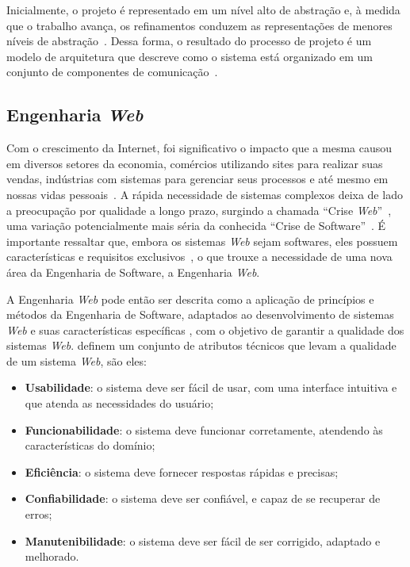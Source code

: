 Inicialmente, o projeto é representado em um nível alto de abstração e, à medida que o trabalho avança,
os refinamentos conduzem as representações de menores níveis de abstração~\cite{falbo:2014}.
Dessa forma, o resultado do processo de projeto é um modelo de arquitetura que descreve como o sistema
está organizado em um conjunto de componentes de comunicação~\cite{sommerville:2011}.


\subsection{Engenharia \textit{Web}}
\label{subsec-fundteo-engsoft-engweb}

Com o crescimento da Internet, foi significativo o impacto que a mesma causou em diversos
setores da economia, comércios utilizando sites para realizar suas vendas, indústrias com
sistemas para gerenciar seus processos e até mesmo em nossas vidas pessoais~\cite{murugesan:2001}.
A rápida necessidade de sistemas complexos deixa de lado a preocupação por qualidade a longo prazo,
surgindo a chamada ``Crise \textit{Web}''~\cite{murugesan:2001}, uma variação potencialmente mais séria da 
conhecida ``Crise de Software''~\cite{gibbs:1994}. É importante ressaltar que, embora os sistemas \textit{Web}
sejam softwares, eles possuem características e requisitos exclusivos~\cite{pressman:2011},
o que trouxe a necessidade de uma nova área da Engenharia de Software, a Engenharia \textit{Web}.

A Engenharia \textit{Web} pode então ser descrita como a aplicação de princípios e métodos da Engenharia
de Software, adaptados ao desenvolvimento de sistemas \textit{Web} e suas características específicas 
\cite{beder:2017,murugesan:2001}, com o objetivo de garantir a qualidade dos sistemas \textit{Web}. 
 definem um conjunto de atributos técnicos que levam a qualidade de um sistema \textit{Web},
são eles:

\begin{itemize}
    \item \textbf{Usabilidade}: o sistema deve ser fácil de usar, com uma interface intuitiva e 
        que atenda as necessidades do usuário;
    \item \textbf{Funcionabilidade}: o sistema deve funcionar corretamente, atendendo às características
        do domínio;
    \item \textbf{Eficiência}: o sistema deve fornecer respostas rápidas e precisas;
    \item \textbf{Confiabilidade}: o sistema deve ser confiável, e capaz de se recuperar de erros;
    \item \textbf{Manutenibilidade}: o sistema deve ser fácil de ser corrigido, adaptado e melhorado.
\end{itemize}

